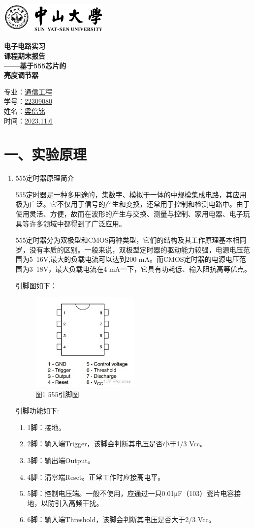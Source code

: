 \documentclass[a4paper,12pt]{article}
\renewcommand{\maketitle}{
	\begin{titlepage}
		\begin{center}
			\includegraphics[width=0.4\textwidth]{1-1.png} %
			\vspace{2cm}
			
			\zihao{-0} \textbf{电子电路实习 \\ 课程期末报告} \\
			\vspace{2cm}
			\zihao{1} \textbf{——基于555芯片的 \\ \qquad 亮度调节器} \\
			\vspace{2cm}
			
			\zihao{2} 专业：\uline{通信工程} \\
			\zihao{2} 学号：\uline{22309080} \\
			\zihao{2} 姓名：\uline{梁倍铭} \\
			\zihao{2} 时间：\uline{2023.11.6} \\
			
			\vfill
		\end{center}
	\end{titlepage}
}
\begin{document}
	\maketitle
	\large
	\onehalfspacing
	\section*{一、实验原理}
	\begin{enumerate}
		\item 555定时器原理简介 \par 
		\qquad555定时器是一种多用途的，集数字、模拟于一体的中规模集成电路，其应用极为广泛。它不仅用于信号的产生和变换，还常用于控制和检测电路中。由于使用灵活、方便，故而在波形的产生与交换、测量与控制、家用电器、电子玩具等许多领域中都得到了广泛应用。\par 
		\qquad555定时器分为双极型和CMOS两种类型，它们的结构及其工作原理基本相同岁，没有本质的区别。一般来说，双极型定时器的驱动能力较强，电源电压范围为5~16V,最大的负载电流可以达到200 mA。而CMOS定时器的电源电压范围为3~18V，最大负载电流在4 mA一下，它具有功耗低、输入阻抗高等优点。\par 
		\qquad 引脚图如下：\par 
		\begin{figure}[h]
			\centering
			\includegraphics[width=0.5\textwidth]{2.jpg}
			\caption*{图1 555引脚图}
		\end{figure}
		\qquad 引脚功能如下:
		\begin{enumerate}
			\item 1脚：接地。
			\item 2脚：输入端Trigger，该脚会判断其电压是否小于1/3 Vcc。
			\item 3脚：输出端Output。
			\item 4脚：清零端Reset。正常工作时应接高电平。
			\item 5脚：控制电压端。一般不使用，应通过一只0.01μF（103）瓷片电容接地，以防引入高频干扰。
			\item 6脚：输入端Threshold，该脚会判断其电压是否大于2/3 Vcc。

\end{enumerate}
\end{enumerate}
\end{document}

